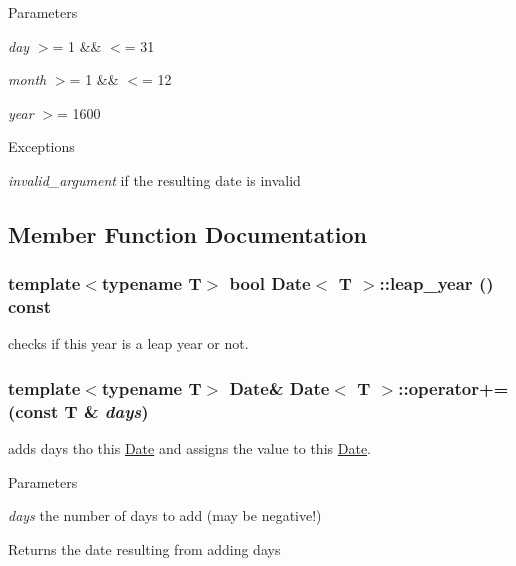 \begin{DoxyParams}{Parameters}
\item[{\em day}]$>$= 1 \&\& $<$= 31 \item[{\em month}]$>$= 1 \&\& $<$= 12 \item[{\em year}]$>$= 1600 \end{DoxyParams}

\begin{DoxyExceptions}{Exceptions}
\item[{\em invalid\_\-argument}]if the resulting date is invalid \end{DoxyExceptions}


\subsection{Member Function Documentation}
\hypertarget{classDate_ab69ff6d65cfc5e1c27fe6fed6e913236}{
\subsubsection[{leap\_\-year}]{\setlength{\rightskip}{0pt plus 5cm}template$<$typename T$>$ bool {\bf Date}$<$ T $>$::leap\_\-year () const}}
\label{classDate_ab69ff6d65cfc5e1c27fe6fed6e913236}
checks if this year is a leap year or not. \hypertarget{classDate_a661f00c4979307ad8de12df28f4dccac}{
\subsubsection[{operator+=}]{\setlength{\rightskip}{0pt plus 5cm}template$<$typename T$>$ {\bf Date}\& {\bf Date}$<$ T $>$::operator+= (const T \& {\em days})}}
\label{classDate_a661f00c4979307ad8de12df28f4dccac}
adds days tho this \hyperlink{classDate}{Date} and assigns the value to this \hyperlink{classDate}{Date}. 
\begin{DoxyParams}{Parameters}
\item[{\em days}]the number of days to add (may be negative!) \end{DoxyParams}
\begin{DoxyReturn}{Returns}
the date resulting from adding days 
\end{DoxyReturn}


